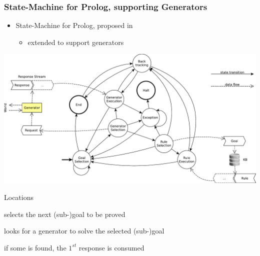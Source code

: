 \documentclass[presentation]{beamer}
\begin{document}
\begin{frame}[allowframebreaks]
    \frametitle{State-Machine for Prolog, supporting Generators}

    \begin{itemize}
        \item State-Machine for Prolog, proposed in 
        \begin{itemize}
            \item extended to support \alert{generators}
        \end{itemize}
    \end{itemize}

    \begin{center}
        \includegraphics[width=.8\linewidth]{img/2p-fsa-dataflow.pdf}
    \end{center}
    \hfill{}

    \framebreak

    \begin{block}{Locations}
        \begin{description}\small
            \item[\textsf{Goal Selection}] selects the next (sub-)goal to be proved

            \item[\textbf{\textsf{Generator Selection}}] looks for a generator to solve the selected (sub-)goal
            
            \item[\textbf{\textsf{Generator Execution}}] if some is found, the $1^{st}$ response is consumed
        

\end{description}
\end{block}
\end{frame}
\end{document}
